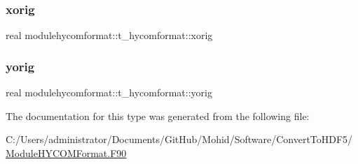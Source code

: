 \subsubsection{\texorpdfstring{xorig}{xorig}}
{\footnotesize\ttfamily real modulehycomformat\+::t\+\_\+hycomformat\+::xorig\hspace{0.3cm}{\ttfamily [private]}}

\mbox{\label{structmodulehycomformat_1_1t__hycomformat_ac3e2fc4a2b2f20a9e3bb4ad2934e05d5}} 
\subsubsection{\texorpdfstring{yorig}{yorig}}
{\footnotesize\ttfamily real modulehycomformat\+::t\+\_\+hycomformat\+::yorig\hspace{0.3cm}{\ttfamily [private]}}



The documentation for this type was generated from the following file\+:\begin{DoxyCompactItemize}
\item 
C\+:/\+Users/administrator/\+Documents/\+Git\+Hub/\+Mohid/\+Software/\+Convert\+To\+H\+D\+F5/\mbox{\hyperlink{_module_h_y_c_o_m_format_8_f90}{Module\+H\+Y\+C\+O\+M\+Format.\+F90}}\end{DoxyCompactItemize}
